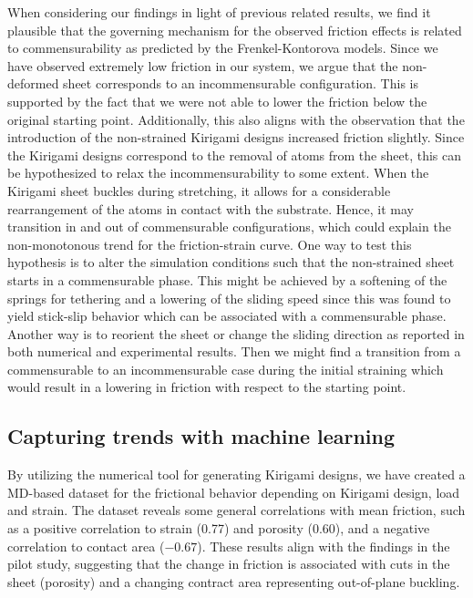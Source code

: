 When considering our findings in light of previous related results, we find it
plausible that the governing mechanism for the observed friction effects is
related to commensurability as predicted by the Frenkel-Kontorova models. Since we have observed extremely low friction in
our system, we argue that the non-deformed sheet corresponds to an
incommensurable configuration. This is supported by the fact that we were not
able to lower the friction below the original starting point. Additionally, this
also aligns with the observation that the introduction of the non-strained
Kirigami designs increased friction slightly. Since the Kirigami designs correspond to the removal of atoms from the sheet, this can be hypothesized to relax the incommensurability to some extent. When the Kirigami sheet buckles during stretching, it allows for a
considerable rearrangement of the atoms in contact with the substrate. Hence, it
may transition in and out of commensurable configurations, which could explain
the non-monotonous trend for the friction-strain curve. One way to test this hypothesis is to alter the simulation conditions such that the non-strained sheet starts in a commensurable phase. This might be achieved by a softening of the springs for tethering and a lowering of the sliding speed since this was found to yield stick-slip behavior which can be associated with a commensurable phase.  Another way is to reorient the sheet or change the sliding direction as reported in both numerical and experimental results. Then we might find a transition from a commensurable to an
incommensurable case during the initial straining which would result in a
lowering in friction with respect to the starting point. 



\subsection{Capturing trends with machine learning}
By utilizing the numerical tool for generating Kirigami designs, we have
created a \acrshort{MD}-based dataset for the frictional behavior depending on
Kirigami design, load and strain. The dataset reveals some general correlations
with mean friction, such as a positive correlation to strain (0.77) and porosity
(0.60), and a negative correlation to contact area ($-0.67$). These results
align with the findings in the pilot study, suggesting that the change in
friction is associated with cuts in the sheet (porosity) and a changing contract area representing out-of-plane buckling. 

